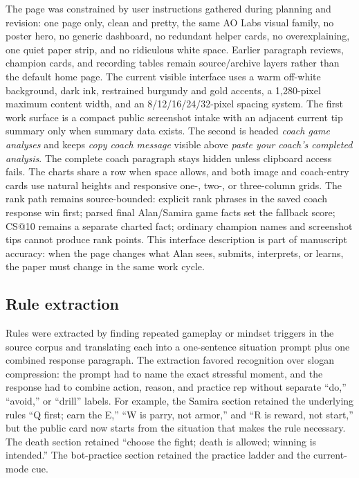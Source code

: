 \documentclass[12pt,letterpaper]{article}
\begin{document}
The page was constrained by user instructions gathered during planning and revision: one page only, clean and pretty, the same AO Labs visual family, no poster hero, no generic dashboard, no redundant helper cards, no overexplaining, one quiet paper strip, and no ridiculous white space. Earlier paragraph reviews, champion cards, and recording tables remain source/archive layers rather than the default home page. The current visible interface uses a warm off-white background, dark ink, restrained burgundy and gold accents, a 1,280-pixel maximum content width, and an 8/12/16/24/32-pixel spacing system. The first work surface is a compact public screenshot intake with an adjacent current tip summary only when summary data exists. The second is headed \emph{coach game analyses} and keeps \emph{copy coach message} visible above \emph{paste your coach's completed analysis}. The complete coach paragraph stays hidden unless clipboard access fails. The charts share a row when space allows, and both image and coach-entry cards use natural heights and responsive one-, two-, or three-column grids. The rank path remains source-bounded: explicit rank phrases in the saved coach response win first; parsed final Alan/Samira game facts set the fallback score; CS@10 remains a separate charted fact; ordinary champion names and screenshot tips cannot produce rank points. This interface description is part of manuscript accuracy: when the page changes what Alan sees, submits, interprets, or learns, the paper must change in the same work cycle.

\subsection*{Rule extraction}

Rules were extracted by finding repeated gameplay or mindset triggers in the source corpus and translating each into a one-sentence situation prompt plus one combined response paragraph. The extraction favored recognition over slogan compression: the prompt had to name the exact stressful moment, and the response had to combine action, reason, and practice rep without separate ``do,'' ``avoid,'' or ``drill'' labels. For example, the Samira section retained the underlying rules ``Q first; earn the E,'' ``W is parry, not armor,'' and ``R is reward, not start,'' but the public card now starts from the situation that makes the rule necessary. The death section retained ``choose the fight; death is allowed; winning is intended.'' The bot-practice section retained the practice ladder and the current-mode cue.
\end{document}
